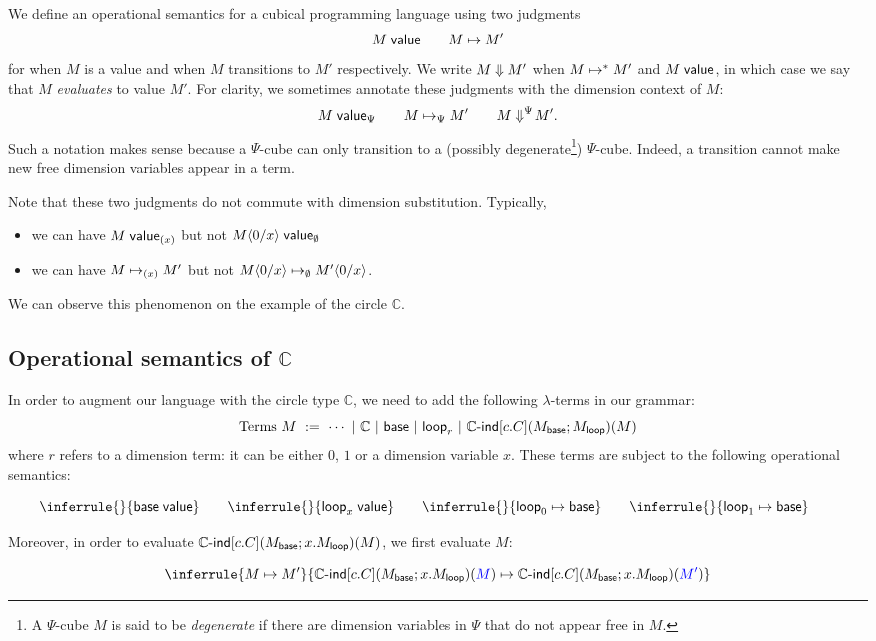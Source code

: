 \documentclass{article}
\newcommand\Circle{\mathbb{C}}
\newcommand\Base{\mathsf{base}}
\newcommand\Loop{\mathsf{loop}}
\newcommand\CIndOp{\Circle\textsf{-ind}}
\newcommand\CInd[4]{\CIndOp\Squares{#1}\Parens*{#2;#3}\Parens{#4}}
\newcommand\DimSubst[3]{#3\langle{#1}/{#2}\rangle}
\DeclarePairedDelimiter\Parens{\lparen}{\rparen}
\DeclarePairedDelimiter\Squares{[}{]}
\begin{document}
We define an operational semantics for a cubical programming
language using two judgments
\[ \valueJ{M} \qquad \step{M}{M'} \] for when $M$ is a value and when
$M$ transitions to $M'$ respectively.  We write $\eval{M}{M'}$ when
$\steps{M}{M'}$ and $\valueJ{M}$, in which case we say that $M$
\emph{evaluates} to value $M'$. For clarity, we sometimes annotate these
judgments with the dimension context of $M$:
\[ \valueDim{M}{\Psi} \qquad \stepDim{M}{M'}{\Psi} \qquad
  \evalDim{M}{M'}{\Psi}.  \] Such a notation makes sense because a
$\Psi$-cube can only transition to a (possibly degenerate\footnote{A
  $\Psi$-cube $M$ is said to be \emph{degenerate} if there are
  dimension variables in $\Psi$ that do not appear free in
  $M$.})  $\Psi$-cube. Indeed, a transition cannot make
new free dimension variables appear in a term.

Note that these two judgments do not commute with dimension
substitution. Typically,
\begin{itemize}
\item we can have $\valueDim{M}{(x)}$ but not
  $\valueDim{\DimSubst{0}{x}{M}}{\EmptyDimCtx}$
\item we can have $\stepDim{M}{M'}{(x)}$ but not
  $\stepDim{\DimSubst{0}{x}{M}}{\DimSubst{0}{x}{M'}}{\EmptyDimCtx}$.
\end{itemize}
We can observe this phenomenon on the example of the circle $\Circle$.


\subsection{Operational semantics of $\Circle$}\label{sec:circle-sem}

In order to augment our language with the circle type $\Circle$, we
need to add the following $\lambda$-terms in our grammar:
\[ \text{Terms } M \ := \ \cdots \ | \ 
  \Circle \ | \ \Base \ | \ \Loop_r \ | \ \CInd{c.C}{M_{\Base}}{M_{\Loop}}{M} \]
where $r$ refers to a dimension term: it can be either $0$, $1$ or a dimension
variable $x$. These terms are subject to the following operational semantics:

\[
\inferrule{}{\valueJ{\Base}} \qquad
\inferrule{}{\valueJ{\Loop_x}} \qquad
\inferrule{}{\step{\Loop_0}{\Base}} \qquad
\inferrule{}{\step{\Loop_1}{\Base}} \qquad
\]

Moreover, in order to evaluate $\CInd{c.C}{M_{\Base}}{x.M_{\Loop}}{M}$, 
we first evaluate $M$:

\[ 
\inferrule{\step{M}{M'}}{
  \step{
    \CInd{c.C}{M_{\Base}}{x.M_{\Loop}}{\colored{M}}
  }{
    \CInd{c.C}{M_{\Base}}{x.M_{\Loop}}{\colored{M'}}
  }
}\]
\end{document}
